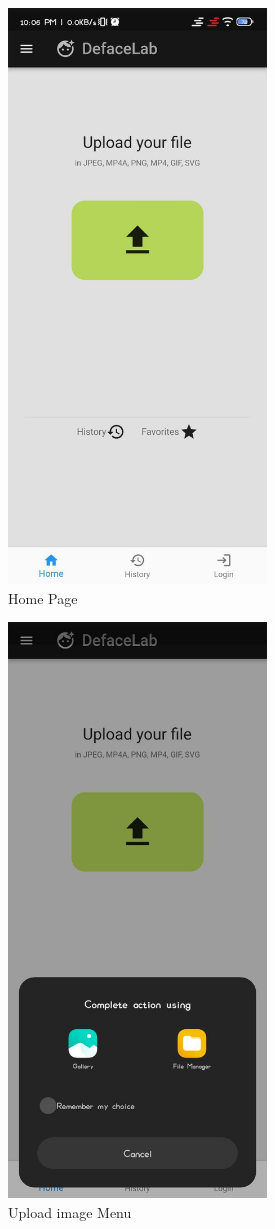 \begin{figure}[ht]
    \centering
    \includegraphics[height =6in ]{img/homepage.jpg}
    \caption{Home Page}
\end{figure}

\begin{figure}[ht]
    \centering
    \includegraphics[height =6in ]{img/uploader.jpg}
    \caption{Upload image Menu}
\end{figure}

